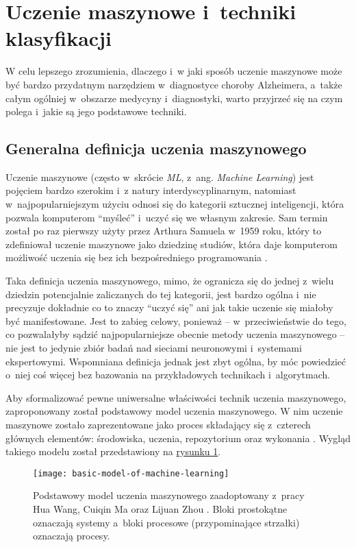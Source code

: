 \section{Uczenie maszynowe i~techniki klasyfikacji}

W celu lepszego zrozumienia, dlaczego i~w jaki sposób uczenie maszynowe może być bardzo przydatnym narzędziem w~diagnostyce choroby Alzheimera, a~także całym ogólniej w~obszarze medycyny i~diagnostyki, warto przyjrzeć się na czym polega i~jakie są jego podstawowe techniki.

\subsection{Generalna definicja uczenia maszynowego}

Uczenie maszynowe (często w~skrócie \emph{ML}, z~ang. \emph{Machine Learning}) jest pojęciem bardzo szerokim i~z natury interdyscyplinarnym, natomiast w~najpopularniejszym użyciu odnosi się do kategorii sztucznej inteligencji, która pozwala komputerom ``myśleć'' i~uczyć się we własnym zakresie.
Sam termin został po raz pierwszy użyty przez Arthura Samuela w~1959 roku, który to zdefiniował uczenie maszynowe jako dziedzinę studiów, która daje komputerom możliwość uczenia się bez ich bezpośredniego programowania \cite{samuel1959some}.

Taka definicja uczenia maszynowego, mimo, że ogranicza się do jednej z~wielu dziedzin potencjalnie zaliczanych do tej kategorii, jest bardzo ogólna i~nie precyzuje dokładnie co to znaczy ``uczyć się'' ani jak takie uczenie się miałoby być manifestowane.
Jest to zabieg celowy, ponieważ -- w~przeciwieństwie do tego, co pozwalałyby sądzić najpopularniejsze obecnie metody uczenia maszynowego -- nie jest to jedynie zbiór badań nad sieciami neuronowymi i~systemami ekspertowymi.
Wspomniana definicja jednak jest zbyt ogólna, by móc powiedzieć o~niej coś więcej bez bazowania na przykładowych technikach i~algorytmach.

Aby sformalizować pewne uniwersalne właściwości technik uczenia maszynowego, zaproponowany został podstawowy model uczenia maszynowego.
W nim uczenie maszynowe zostało zaprezentowane jako proces składający się z~czterech głównych elementów: środowiska, uczenia, repozytorium oraz wykonania \cite{wang2009brief}.
Wygląd takiego modelu został przedstawiony na \hyperref[fig:basic-model-of-machine-learning]{rysunku \ref*{fig:basic-model-of-machine-learning}}.

\begin{figure}[ht]
  \texttt{[image: basic-model-of-machine-learning]}
  \caption[Podstawowy model uczenia maszynowego]{Podstawowy model uczenia maszynowego zaadoptowany z~pracy Hua Wang, Cuiqin Ma oraz Lijuan Zhou \cite{wang2009brief}. Bloki prostokątne oznaczają systemy a~bloki procesowe (przypominające strzałki) oznaczają procesy.}
  \label{fig:basic-model-of-machine-learning}
\end{figure}

